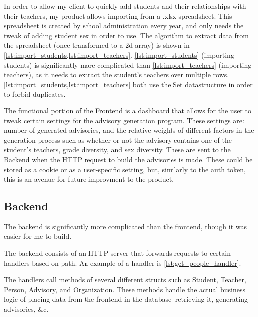\documentclass{paper}
\begin{document}
In order to allow my client to quickly add students and their relationships with their teachers, my product allows importing from a .xlsx spreadsheet.
This spreadsheet is created by school administration every year, and only needs the tweak of adding student sex in order to use.
The algorithm to extract data from the spreadsheet (once transformed to a 2d array) is shown in \cref{lst:import_students,lst:import_teachers}.
\cref{lst:import_students} (importing students) is significantly more complicated than \cref{lst:import_teachers} (importing teachers), as it needs to extract the student's teachers over multiple rows.
\cref{lst:import_students,lst:import_teachers} both use the Set datastructure in order to forbid duplicates.





The functional portion of the Frontend is a dashboard that allows for the user to tweak certain settings for the advisory generation program.
These settings are: number of generated advisories, and the relative weights of different factors in the generation process such as whether or not the advisory contains one of the student's teachers, grade diversity, and sex diversity.
These are sent to the Backend when the HTTP request to build the advisories is made.
These could be stored as a cookie or as a user-specific setting, but, similarly to the auth token, this is an avenue for future improvment to the product.

\subsection{Backend}
\label{subsec:backend}
The backend is significantly more complicated than the frontend, though it was easier for me to build.

The backend consists of an HTTP server that forwards requests to certain handlers based on path.
An example of a handler is \cref{lst:get_people_handler}.



The handlers call methods of several different structs such as Student, Teacher, Person, Advisory, and Organization.
These methods handle the actual business logic of placing data from the frontend in the database, retrieving it, generating advisories, \&c.
\end{document}
